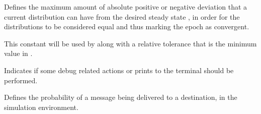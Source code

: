 \documentclass[letterpaper,10pt,english]{sphinxmanual}
\begin{document}

\begin{fulllineitems}
\label{\detokenize{app:app.environment_settings.ATOL}}
Defines the maximum amount of absolute positive or negative deviation that a
current distribution {\hyperref[\detokenize{app.domain:app.domain.cluster_groups.SGCluster.cv_}]{}} can
have from the desired steady state
{\hyperref[\detokenize{app.domain:app.domain.cluster_groups.SGCluster.v_}]{}}, in order for the
distributions to be considered equal and thus marking the epoch as convergent.

This constant will be used by
{\hyperref[\detokenize{app.domain:app.domain.cluster_groups.SGCluster.equal_distributions}]{}} along
with a relative tolerance that is the minimum value in
{\hyperref[\detokenize{app.domain:app.domain.cluster_groups.SGCluster.v_}]{}}.

\end{fulllineitems}


\begin{fulllineitems}
\label{\detokenize{app:app.environment_settings.DEBUG}}
Indicates if some debug related actions or prints to the terminal should
be performed.

\end{fulllineitems}


\begin{fulllineitems}
\label{\detokenize{app:app.environment_settings.DELIVER_CHANCE}}
Defines the probability of a message being delivered to a destination,
in the simulation environment.

\end{fulllineitems}
\end{document}
